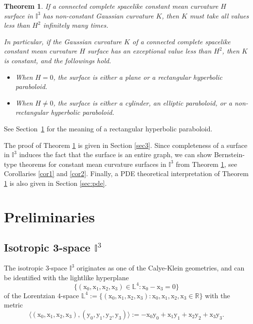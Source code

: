 \documentclass[12pt,a4paper,reqno]{amsart}
\theoremstyle{plain} %
\newtheorem{theorem}{Theorem}[section]
\theoremstyle{definition}
\newcommand{\rmx}{\mathrm{x}}
\newcommand{\rmy}{\mathrm{y}}
\begin{document}
\begin{theorem}\label{thm:main}
If a connected complete spacelike constant mean curvature $H$ surface in $\mathbb{I}^3$ has non-constant Gaussian curvature $K$, then $K$ must take all values less than $H^2$ infinitely many times.  

In particular, if the Gaussian curvature $K$ of a connected complete spacelike constant mean curvature $H$ surface has an exceptional value less than $H^2$, then $K$ is constant, and the followings hold. 
\begin{itemize}
\item[$(1)$] When $H = 0$, the surface is either a plane or a rectangular hyperbolic paraboloid.
\item[$(2)$] When $H\ne0$, the surface is either a cylinder, an elliptic paraboloid, or a non-rectangular hyperbolic paraboloid.
\end{itemize}
\end{theorem}
 See Section~\ref{Sec.2} for the meaning of a rectangular hyperbolic paraboloid. 

The proof of Theorem \ref{thm:main} is given in Section \ref{sec3}. Since completeness of a surface in $\mathbb{I}^3$ induces the fact that the surface is an entire graph, we can show Bernstein-type theorems for constant mean curvature surfaces in $\mathbb{I}^3$ from Theorem \ref{thm:main}, see Corollaries \ref{cor1} and \ref{cor2}.
Finally, a PDE theoretical interpretation of Theorem \ref{thm:main} is also given in Section \ref{sec:pde}.


\section{Preliminaries}\label{Sec.2}

\subsection{Isotropic 3-space $\mathbb{I}^3$}

The isotropic 3-space $\mathbb{I}^3$ originates as one of the Calye-Klein geometries, and
can be identified with the  lightlike hyperplane
	\[
		\{  (\rmx_0, \rmx_1, \rmx_2, \rmx_3)  \in \mathbb{L}^4  : \rmx_0-\rmx_3=0 \} 
	\]
of the Lorentzian $4$-space
$\mathbb{L}^4 := \{ (\rmx_0, \rmx_1, \rmx_2, \rmx_3) : \rmx_0, \rmx_1, \rmx_2, \rmx_3 \in \mathbb{R}\} $ with the  metric
	\[
		\langle (\rmx_0, \rmx_1, \rmx_2, \rmx_3), (\rmy_0, \rmy_1, \rmy_2, \rmy_3) \rangle := -\rmx_0 \rmy_0 + \rmx_1 \rmy_1 + \rmx_2 \rmy_2 + \rmx_3 \rmy_3.
	\]
\end{document}

